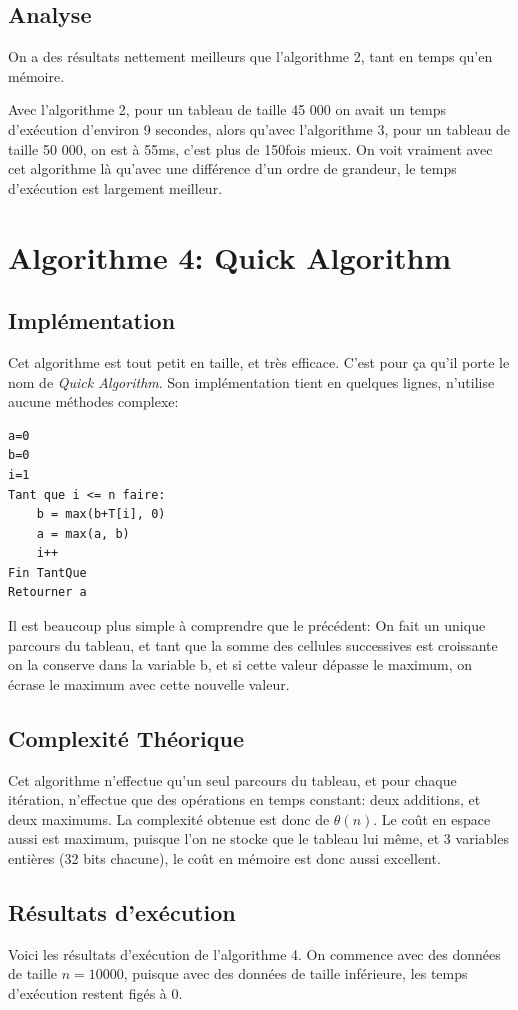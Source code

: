 \documentclass[a4paper, 12pt]{article}
\begin{document}
\subsection{Analyse}
On a des résultats nettement meilleurs que l'algorithme 2, tant en temps qu'en mémoire.

Avec l'algorithme 2, pour un tableau de taille 45 000 on avait un temps d'exécution d'environ 9 secondes, alors qu'avec l'algorithme 3, pour un tableau de taille 50 000, on est à 55ms, c'est plus de 150fois mieux.
On voit vraiment avec cet algorithme là qu'avec une différence d'un ordre de grandeur, le temps d'exécution est largement meilleur.
 
\section{Algorithme 4: Quick Algorithm}
\subsection{Implémentation}
Cet algorithme est tout petit en taille, et très efficace. C'est pour ça qu'il porte le nom de \emph{Quick Algorithm}. Son implémentation tient en quelques lignes, n'utilise aucune méthodes complexe:
\begin{verbatim}
a=0
b=0
i=1
Tant que i <= n faire:
    b = max(b+T[i], 0)
    a = max(a, b)
    i++
Fin TantQue
Retourner a
\end{verbatim}
Il est beaucoup plus simple à comprendre que le précédent: On fait un unique parcours du tableau, et tant que la somme des cellules successives est croissante on la conserve dans la variable b, et si cette valeur dépasse le maximum, on écrase le maximum avec cette nouvelle valeur.
\subsection{Complexité Théorique}
Cet algorithme n'effectue qu'un seul parcours du tableau, et pour chaque itération, n'effectue que des opérations en temps constant: deux additions, et deux maximums. 
La complexité obtenue est donc de $\theta(n)$. Le coût en espace aussi est maximum, puisque l'on ne stocke que le tableau lui même, et 3 variables entières (32 bits chacune), le coût en mémoire est donc aussi excellent.  
\subsection{Résultats d’exécution}
Voici les résultats d'exécution de l'algorithme 4. On commence avec des données de taille $n=10000$, puisque avec des données de taille inférieure, les temps d'exécution restent figés à 0. 
\end{document}
